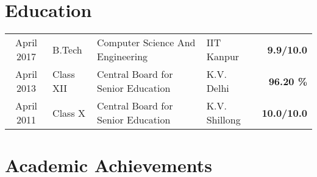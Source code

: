 \documentclass[a4paper]{norm-resume} %
\begin{document}

\lastupdated %


\vspace{2mm}


\section{Education}
		
\begin{tabularx}{\textwidth}{c l X l r}	
	{April 2017 \hspace{10mm}} & B.Tech \hspace{15mm} & Computer Science And Engineering & {IIT Kanpur \hspace{10mm}} & {\textbf{{9.9/10.0}}}\\		
	{April 2013 \hspace{10mm}} & Class XII & Central Board for Senior Education & \textsc{K.V.} Delhi & {\textbf{{96.20 \%}}}\\
	{April 2011 \hspace{10mm}} & Class X & Central Board for Senior Education & \textsc{K.V.} Shillong & {\textbf{{10.0/10.0}}}\\	
\end{tabularx}

\vspace{1mm}	%


\section{Academic Achievements}

\vspace{3mm} %
		
\end{document}
